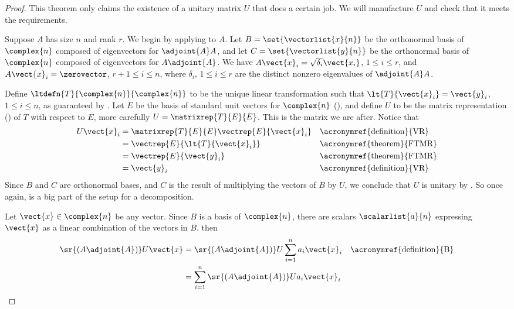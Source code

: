 \begin{proof}
This theorem only claims the existence of a unitary matrix $U$ that does a certain job.  We will manufacture $U$ and check that it meets the requirements.\par
%
Suppose $A$ has size $n$ and rank $r$.  We begin by applying  to $A$.  Let $B=\set{\vectorlist{x}{n}}$ be the orthonormal basis of $\complex{n}$ composed of eigenvectors for $\adjoint{A}A$, and let $C=\set{\vectorlist{y}{n}}$ be the orthonormal basis of $\complex{n}$ composed of eigenvectors for $A\adjoint{A}$.  We have $A\vect{x}_i=\sqrt{\delta_i}\vect{x_i}$, $1\leq i\leq r$, and $A\vect{x}_i=\zerovector$, $r+1\leq i\leq n$, where $\delta_i$, $1\leq i\leq r$ are the distinct nonzero eigenvalues of $\adjoint{A}A$.\par
%
Define $\ltdefn{T}{\complex{n}}{\complex{n}}$ to be the unique linear transformation such that $\lt{T}{\vect{x}_i}=\vect{y}_i$, $1\leq i\leq n$, as guaranteed by .  Let $E$ be the basis of standard unit vectors for $\complex{n}$ (), and define $U$ to be the matrix representation () of $T$ with respect to $E$, more carefully $U=\matrixrep{T}{E}{E}$.  This is the matrix we are after.
Notice that
%
\begin{align*}
U\vect{x}_i
&=
\matrixrep{T}{E}{E}\vectrep{E}{\vect{x}_i}
&&\text{\acronymref{definition}{VR}}\\
%
&=\vectrep{E}{\lt{T}{\vect{x}_i}}
&&\text{\acronymref{theorem}{FTMR}}\\
%
&=\vectrep{E}{\vect{y}_i}
&&\text{\acronymref{theorem}{FTMR}}\\
%
&=\vect{y}_i
&&\text{\acronymref{definition}{VR}}
%
\end{align*}
%
Since $B$ and $C$ are orthonormal bases, and $C$ is the result of multiplying the vectors of $B$ by $U$, we conclude that $U$ is unitary by .  So once again,  is a big part of the setup for a decomposition.\par
%
Let $\vect{x}\in\complex{n}$ be any vector.  Since $B$ is a basis of $\complex{n}$, there are scalars $\scalarlist{a}{n}$ expressing $\vect{x}$ as a linear combination of the vectors in $B$.  then
%
\begin{align*}
\sr{\left(A\adjoint{A}\right)}U\vect{x}
&=\sr{\left(A\adjoint{A}\right)}U\sum_{i=1}^{n}a_i\vect{x}_i
&&\text{\acronymref{definition}{B}}\\
%
&=\sum_{i=1}^{n}\sr{\left(A\adjoint{A}\right)}Ua_i\vect{x}_i

\end{align*}
\end{proof}
